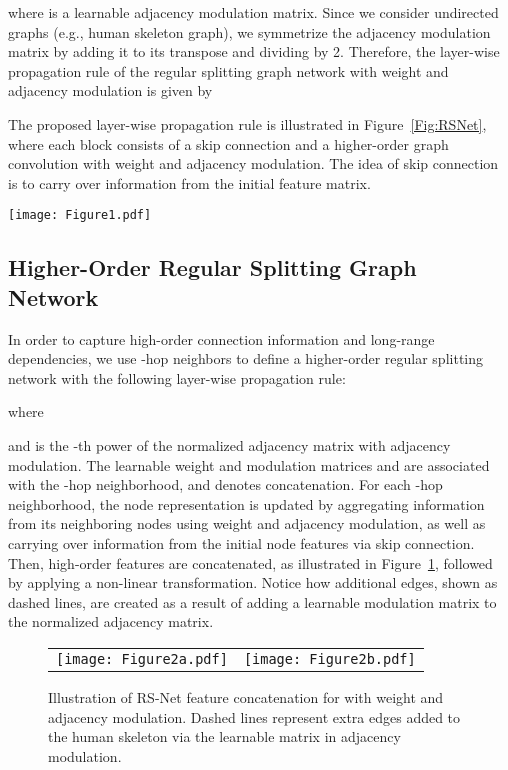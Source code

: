 \documentclass[10pt,journal]{IEEEtran}
\begin{document}
where  is a learnable adjacency modulation matrix. Since we consider undirected graphs (e.g., human skeleton graph), we symmetrize the adjacency modulation matrix  by adding it to its transpose and dividing by 2. Therefore, the layer-wise propagation rule of the regular splitting graph network with weight and adjacency modulation is given by


The proposed layer-wise propagation rule is illustrated in Figure~\ref{Fig:RSNet}, where each block consists of a skip connection and a higher-order graph convolution with weight and adjacency modulation. The idea of skip connection is to carry over information from the initial feature matrix. 	

\begin{figure*}[!htb]
\centering
\texttt{[image: Figure1.pdf]}
\caption{Illustration of the layer-wise propagation rule for the proposed RS-Net model. Each block is comprised of a skip connection and a higher-order graph convolution with weight and adjacency modulation.}
\label{Fig:RSNet}
\end{figure*}

\subsection{Higher-Order Regular Splitting Graph Network}
In order to capture high-order connection information and long-range dependencies, we use -hop neighbors to define a higher-order regular splitting network with the following layer-wise propagation rule:

where

and  is the -th power of the normalized adjacency matrix with adjacency modulation. The learnable weight and modulation matrices  and  are associated with the -hop neighborhood, and  denotes concatenation. For each -hop neighborhood, the node representation is updated by aggregating information from its neighboring nodes using weight and adjacency modulation, as well as carrying over information from the initial node features via skip connection. Then, high-order features are concatenated, as illustrated in Figure~\ref{Fig:humangraph2}, followed by applying a non-linear transformation. Notice how additional edges, shown as dashed lines, are created as a result of adding a learnable modulation matrix to the normalized adjacency matrix.
	
\begin{figure}[!htb]
\setlength{\tabcolsep}{1em}
\centering
\begin{tabular}{cc}
\texttt{[image: Figure2a.pdf]} &
\texttt{[image: Figure2b.pdf]}
\end{tabular}
\caption{Illustration of RS-Net feature concatenation for  with weight and adjacency modulation. Dashed lines represent extra edges added to the human skeleton via the learnable matrix in adjacency modulation.}
\label{Fig:humangraph2}
\end{figure}
	
\end{document}
